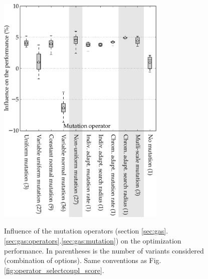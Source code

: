 \documentclass{ametsoc}
\begin{document}
\begin{figure}[t]
	\begin{center}
		\noindent\includegraphics[width=19pc,angle=0]{fig06.pdf}\\
	\end{center}
	\caption{Influence of the mutation operators (section \ref{sec:gas}.\ref{sec:gas:operators}.\ref{sec:gas:mutation}) on the optimization performance. In parentheses is the number of variants considered (combination of options). Same conventions as Fig. \ref{fig:operator_selectcoupl_score}.}
	\label{fig:operator_mutation_score}
\end{figure}
\end{document}
